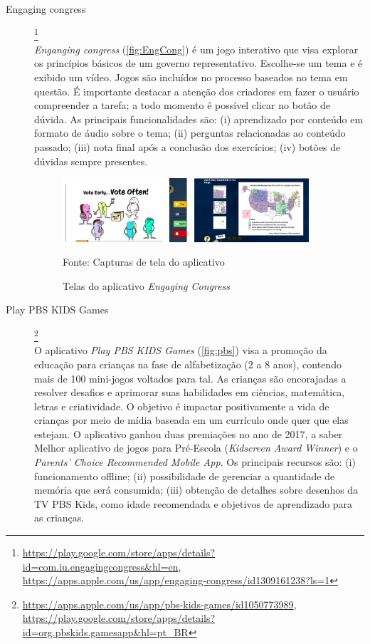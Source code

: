 \begin{description}

\item[Engaging congress]\footnote{\url{https://play.google.com/store/apps/details?id=com.iu.engagingcongress&hl=en}, \url{https://apps.apple.com/us/app/engaging-congress/id1309161238?ls=1}} \hfill \\
\textit{Enganging congress} (\autoref{fig:EngCong}) é um jogo interativo que visa explorar os princípios básicos de um governo representativo. Escolhe-se um tema e é exibido um vídeo. Jogos são incluídos no processo baseados no tema em questão. É importante destacar a atenção dos criadores em fazer o usuário compreender a tarefa; a todo momento é possível clicar no botão de dúvida. As principais funcionalidades são: (i) aprendizado por conteúdo em formato de áudio sobre o tema; (ii) perguntas relacionadas ao conteúdo passado; (iii) nota final após a conclusão dos exercícios; (iv) botões de dúvidas sempre presentes.

\begin{figure}[ht!]
\centering
    \caption{Telas do aplicativo \textit{Engaging Congress}}
    \label{fig:EngCong}
    \includegraphics[width=0.9\textwidth]{Figuras/engagingcongress.png}
    
    Fonte: Capturas de tela do aplicativo
\end{figure}

\item[Play PBS KIDS Games]\footnote{\url{https://apps.apple.com/us/app/pbs-kids-games/id1050773989}, \url{https://play.google.com/store/apps/details?id=org.pbskids.gamesapp&hl=pt_BR}} \hfill \\
O aplicativo \textit{Play PBS KIDS Games} (\autoref{fig:pbs}) visa a promoção da educação para crianças na fase de alfabetização (2 a 8 anos), contendo mais de 100 mini-jogos voltados para tal. As crianças são encorajadas a resolver desafios e aprimorar suas habilidades em ciências, matemática, letras e criatividade. O objetivo é impactar positivamente a vida de crianças por meio de mídia baseada em um currículo onde quer que elas estejam. O aplicativo ganhou duas premiações no ano de 2017, a saber Melhor aplicativo de jogos para Pré-Escola (\textit{Kidscreen Award Winner}) e o \textit{Parents' Choice Recommended Mobile App}. Os principais recursos são: (i) funcionamento offline; (ii) possibilidade de gerenciar a quantidade de memória que será consumida; (iii) obtenção de detalhes sobre desenhos da TV PBS Kids, como idade recomendada e objetivos de aprendizado para as crianças.


\end{description}
